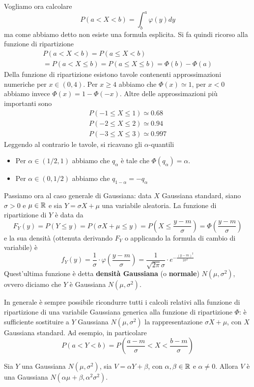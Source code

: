 Vogliamo ora calcolare
\[ P(a < X < b) = \int_b^a \varphi (y) dy \]
ma come abbiamo detto non esiste una formula esplicita. Si fa quindi ricorso alla funzione di
ripartizione
\begin{multline*}
	P(a < X < b) = P(a \leq X < b) \\
	= P(a < X \leq b) = P(a \leq X \leq b) = \Phi(b) - \Phi(a)
\end{multline*}
Della funzione di ripartizione esistono tavole contenenti approssimazioni numeriche per
$x \in (0,4)$. Per $x \geq 4$ abbiamo che $\Phi(x) \simeq 1$, per $x < 0$ abbiamo invece
$\Phi(x) = 1 - \Phi(-x)$. Altre delle approssimazioni più importanti sono
\begin{gather*}
	P(-1 \leq X \leq 1) \simeq 0.68 \\
	P(-2 \leq X \leq 2) \simeq 0.94 \\
	P(-3 \leq X \leq 3) \simeq 0.997
\end{gather*}
Leggendo al contrario le tavole, si ricavano gli $\alpha$-quantili
\begin{itemize}
	\item Per $\alpha \in (1/2, 1)$ abbiamo che $q_\alpha$ è tale che $\Phi(q_\alpha) = \alpha$.
	\item Per $\alpha \in (0, 1/2)$ abbiamo che $q_{1-\alpha} = -q_\alpha$
\end{itemize}
Passiamo ora al caso generale di Gaussiana: data $X$ Gaussiana standard, siano $\sigma > 0$ e
$\mu \in \mathbb{R}$ e sia $Y = \sigma X + \mu$ una variabile aleatoria. La funzione di ripartizione di
$Y$ è data da
\[
	F_Y(y) = P(Y \leq y) = P(\sigma X + \mu \leq y)
	= P\left(X \leq \frac{y - m}{\sigma}\right)
	= \Phi \left(\frac{y - m}{\sigma}\right)
\]
e la sua densità (ottenuta derivando $F_Y$ o applicando la formula di cambio di variabile) è
\[
	f_Y(y) = \frac{1}{\sigma} \cdot \varphi \left(\frac{y - m}{\sigma}\right) =
	\frac{1}{\sqrt{2 \pi} \sigma} \cdot e^{-\frac{(y - m)^2}{2 \sigma^2}}
\]
Quest'ultima funzione è detta \textbf{densità Gaussiana} (o \textbf{normale}) $N(\mu, \sigma^2)$,
ovvero diciamo che $Y$ è Gaussiana $N(\mu, \sigma^2)$.

In generale è sempre possibile ricondurre tutti i calcoli relativi alla funzione di ripartizione
di una variabile Gaussiana generica alla funzione di ripartizione $\Phi$: è sufficiente sostituire
a $Y$ Gaussiana $N(\mu, \sigma^2)$ la rappresentazione $\sigma X + \mu$, con $X$ Gaussiana
standard. Ad esempio, in particolare
\[ P(a < Y < b) = P \left( \frac{a-m}{\sigma} < X < \frac{b-m}{\sigma} \right) \]

\begin{theorem}[Riproducibilità]
	Sia $Y$ una Gaussiana $N(\mu, \sigma^2)$, sia $V = \alpha Y + \beta$, con
	$\alpha, \beta \in \mathbb{R}$ e $\alpha \neq 0$. Allora $V$ è una Gaussiana
	$N(\alpha \mu + \beta, \alpha^2 \sigma^2)$.
\end{theorem}